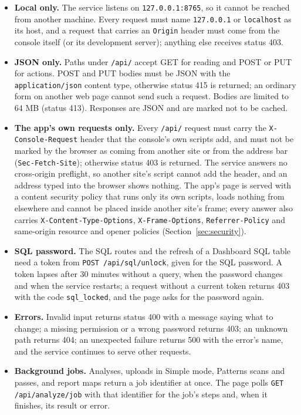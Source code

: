 \documentclass[11pt,a4paper]{article}
\begin{document}
\begin{itemize}
\item \textbf{Local only.} The service listens on \nolinkurl{127.0.0.1:8765}, so it cannot be reached from another machine. Every request must name \nolinkurl{127.0.0.1} or \nolinkurl{localhost} as its host, and a request that carries an \nolinkurl{Origin} header must come from the console itself (or its development server); anything else receives status 403.
\item \textbf{JSON only.} Paths under \nolinkurl{/api/} accept GET for reading and POST or PUT for actions. POST and PUT bodies must be JSON with the \nolinkurl{application/json} content type, otherwise status 415 is returned; an ordinary form on another web page cannot send such a request. Bodies are limited to 64 MB (status 413). Responses are JSON and are marked not to be cached.
\item \textbf{The app's own requests only.} Every \nolinkurl{/api/} request must carry the \nolinkurl{X-Console-Request} header that the console's own scripts add, and must not be marked by the browser as coming from another site or from the address bar (\nolinkurl{Sec-Fetch-Site}); otherwise status 403 is returned. The service answers no cross-origin preflight, so another site's script cannot add the header, and an address typed into the browser shows nothing. The app's page is served with a content security policy that runs only its own scripts, loads nothing from elsewhere and cannot be placed inside another site's frame; every answer also carries \nolinkurl{X-Content-Type-Options}, \nolinkurl{X-Frame-Options}, \nolinkurl{Referrer-Policy} and same-origin resource and opener policies (Section~\ref{sec:security}).
\item \textbf{SQL password.} The SQL routes and the refresh of a Dashboard SQL table need a token from \nolinkurl{POST /api/sql/unlock}, given for the SQL password. A token lapses after 30 minutes without a query, when the password changes and when the service restarts; a request without a current token returns 403 with the code \nolinkurl{sql_locked}, and the page asks for the password again.
\item \textbf{Errors.} Invalid input returns status 400 with a message saying what to change; a missing permission or a wrong password returns 403; an unknown path returns 404; an unexpected failure returns 500 with the error's name, and the service continues to serve other requests.
\item \textbf{Background jobs.} Analyses, uploads in Simple mode, Patterns scans and passes, and report maps return a job identifier at once. The page polls \nolinkurl{GET /api/analyze/job} with that identifier for the job's steps and, when it finishes, its result or error.

\end{itemize}
\end{document}
